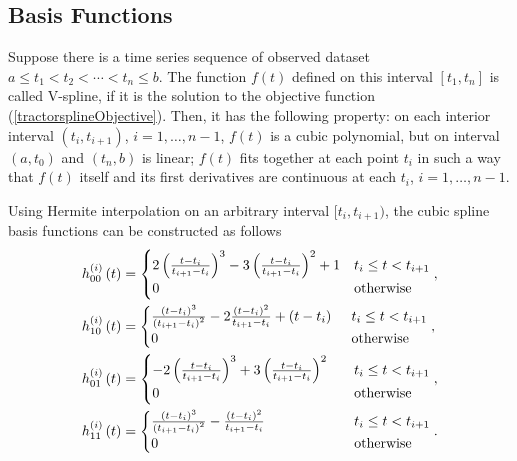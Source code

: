\subsection{Basis Functions}
Suppose there is a time series sequence of observed dataset $a\leq t_1<t_2<\cdots<t_n \leq b$. The function $f(t)$ %
defined on this interval $[t_1,t_n]$ is called V-spline, if it is the solution to the objective function (\ref{tractorsplineObjective}). Then, it has the following property: on each interior interval $(t_i,t_{i+1})$, $i=1,\ldots,n-1$, $f(t)$ is a cubic polynomial, but on interval $(a,t_0)$ and $(t_n,b)$ is linear; $f(t)$ fits together at each point $t_i$ in such a way that $f(t)$ itself and its first derivatives are continuous at each $t_i$,  $i=1,\ldots,n-1$. 

Using Hermite interpolation on an arbitrary interval $[t_i,t_{i+1} ) $, the cubic spline basis functions can be constructed as follows
\begin{align}\label{hermitebasis1}
& h_{00}^{\left(i\right)}\left(t\right)=
\begin{cases}
2\left(\frac{t-t_{i}}{t_{i+1}-t_{i}}\right)^3-3\left(\frac{t-t_{i}}{t_{i+1}-t_{i}}\right)^2+1 & t_i\leq t<t_{i+1} \\ 
0 & \mbox{otherwise}
\end{cases}, \\
& h_{10}^{\left(i\right)}\left(t\right)=\begin{cases}
\frac{\left(t-t_{i}\right)^3}{\left(t_{i+1}-t_{i}\right)^2}-2\frac{\left(t-t_{i}\right)^2}{t_{i+1}-t_{i}}+\left(t-t_{i}\right)  \hphantom{.}  & t_i\leq t<t_{i+1} \\ 
0 &   \mbox{otherwise}
\end{cases},\\
& h_{01}^{\left(i\right)}\left(t\right)=
\begin{cases}
-2\left(\frac{t-t_i}{t_{i+1}-t_i}\right)^3+3\left(\frac{t-t_i}{t_{i+1}-t_i}\right)^2 \hphantom{+} & t_i\leq t<t_{i+1} \\ 
0 &   \mbox{otherwise}
\end{cases},\\
& h_{11}^{\left(i\right)}\left(t\right)=\begin{cases}
\frac{\left(t-t_i\right)^3}{\left(t_{i+1}-t_i\right)^2}-\frac{\left(t-t_i\right)^2}{t_{i+1}-t_i}  \hphantom{+t-+123-}  & t_i\leq t<t_{i+1} \\ 
0 &   \mbox{otherwise}
\end{cases}.
\end{align}

